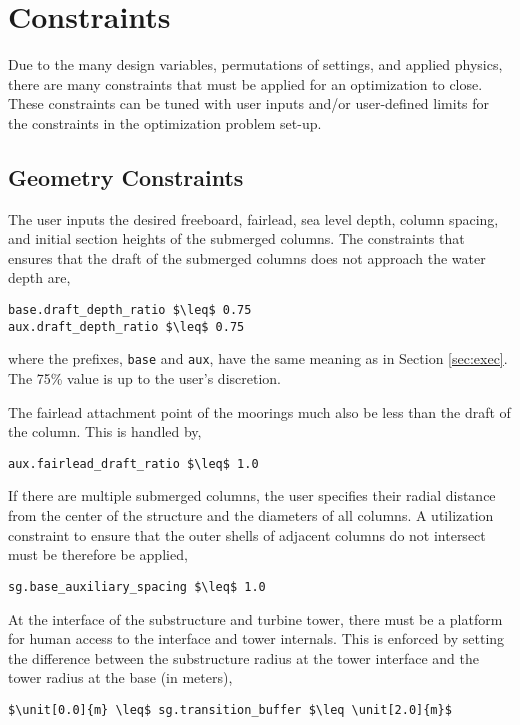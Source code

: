 \section{Constraints}
Due to the many design variables, permutations of settings, and applied
physics, there are many constraints that must be applied for an
optimization to close.  These constraints can be tuned with user inputs
and/or user-defined limits for the constraints in the optimization problem set-up.

\subsection{Geometry Constraints}
The user inputs the desired freeboard, fairlead, sea level depth, column
spacing, and initial section heights of the submerged columns.  The
constraints that ensures that the draft of the submerged columns does
not approach the water depth are,
\begin{lstlisting}
base.draft_depth_ratio $\leq$ 0.75
aux.draft_depth_ratio $\leq$ 0.75
\end{lstlisting}
where the prefixes, \texttt{base} and \texttt{aux}, have the same
meaning as in Section \ref{sec:exec}.  The 75\% value is up to the
user's discretion.

The fairlead attachment point of the moorings much also be less than the
draft of the column.  This is handled by,
\begin{lstlisting}
aux.fairlead_draft_ratio $\leq$ 1.0
\end{lstlisting}

If there are multiple submerged columns, the user specifies their radial
distance from the center of the structure and the diameters of all
columns.  A utilization constraint to ensure that the outer shells of adjacent
columns do not intersect must be therefore be applied,
\begin{lstlisting}
sg.base_auxiliary_spacing $\leq$ 1.0
\end{lstlisting}

At the interface of the substructure and turbine tower, there must be a
platform for human access to the interface and tower internals.  This is
enforced by setting the difference between the substructure radius at
the tower interface and the tower radius at the base (in meters),
\begin{lstlisting}
$\unit[0.0]{m} \leq$ sg.transition_buffer $\leq \unit[2.0]{m}$
\end{lstlisting}

